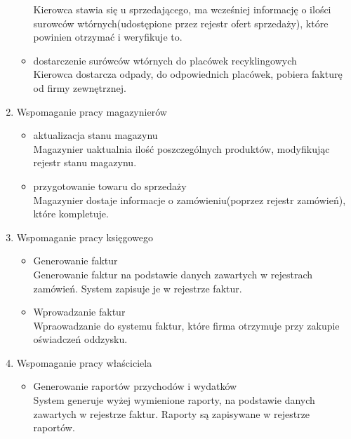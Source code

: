 \begin{enumerate}
\begin{itemize}
		Kierowca stawia się u sprzedającego, ma wcześniej informację o ilości surowców wtórnych(udostępione przez rejestr ofert sprzedaży), które powinien otrzymać i weryfikuje to.
		\item dostarczenie surówców wtórnych do placówek recyklingowych \\ 
		Kierowca dostarcza odpady, do odpowiednich placówek, pobiera fakturę od firmy zewnętrznej.
		\end{itemize}
	\item Wspomaganie pracy magazynierów
		\begin{itemize}
		\item aktualizacja stanu magazynu \\
	 	Magazynier uaktualnia ilość poszczególnych produktów, modyfikując rejestr stanu magazynu.
	 	\item przygotowanie towaru do sprzedaży \\
	 	Magazynier dostaje informacje o zamówieniu(poprzez rejestr zamówień), które kompletuje.
		\end{itemize}
	\item Wspomaganie pracy księgowego
		\begin{itemize}
		\item Generowanie faktur \\ 
		Generowanie faktur na podstawie danych zawartych w rejestrach zamówień. System zapisuje je w rejestrze faktur.
		\item Wprowadzanie faktur \\
		Wpraowadzanie do systemu faktur, które firma otrzymuje przy zakupie oświadczeń oddzysku.
		\end{itemize}
	\item Wspomaganie pracy właściciela
		\begin{itemize}
		\item Generowanie raportów przychodów i wydatków\\
		System generuje wyżej wymienione raporty, na podstawie danych zawartych w rejestrze faktur. Raporty są zapisywane w rejestrze raportów.
		\end{itemize}

\end{enumerate}
